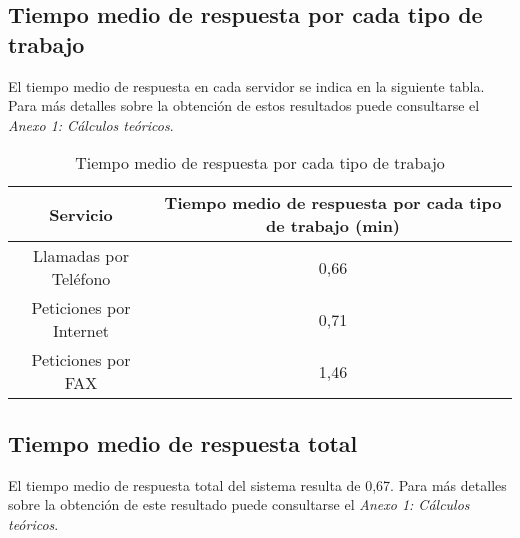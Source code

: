 \subsection{Tiempo medio de respuesta por cada tipo de trabajo}
El tiempo medio de respuesta en cada servidor se indica en la siguiente tabla. Para más detalles sobre la obtención de estos resultados puede consultarse el \textit{Anexo 1: Cálculos teóricos}.\\

\begin{table}[H]
  \begin{center}
  \begin{tabular}{|c|c|}
    \hline
    \textbf{Servicio}       & \textbf{Tiempo medio de respuesta por cada tipo de trabajo (min)} \\ \hline
    Llamadas por Teléfono   & 0,66                   \\ \hline
    Peticiones por Internet & 0,71                  \\ \hline
    Peticiones por FAX      & 1,46                   \\ \hline
  \end{tabular}
\end{center}
  \caption{Tiempo medio de respuesta por cada tipo de trabajo}
  \end{table}
  
\subsection{Tiempo medio de respuesta total}
El tiempo medio de respuesta total del sistema resulta de 0,67. Para más detalles sobre la obtención de este resultado puede consultarse el \textit{Anexo 1: Cálculos teóricos}.\\

